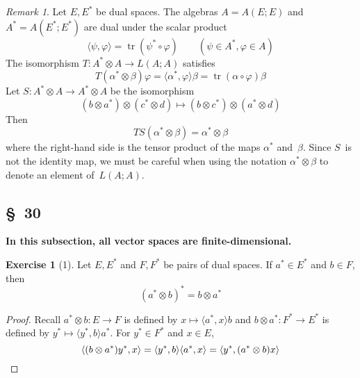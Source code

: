 \documentclass[letterpaper,12pt]{article}
\DeclareMathOperator{\tr}{tr}
\newcommand{\after}{\circ}
\newcommand{\tprod}{\otimes}
\newcommand{\sprod}[2]{\langle#1,#2\rangle}
\theoremstyle{definition}
\newtheorem*{exer}{Exercise}
\theoremstyle{remark}
\newtheorem*{rmk}{Remark}
\begin{document}
\begin{rmk}
Let \(E,E^*\) be dual spaces. The algebras \(A=A(E;E)\) and \(A^*=A(E^*;E^*)\) are dual under the scalar product
\[\sprod{\psi}{\varphi}=\tr(\psi^*\after\varphi)\qquad(\psi\in A^*,\varphi\in A)\]
The isomorphism \(T:A^*\tprod A\to L(A;A)\) satisfies
\[T(\alpha^*\tprod\beta)\varphi=\sprod{\alpha^*}{\varphi}\beta=\tr(\alpha\after\varphi)\beta\]
Let \(S:A^*\tprod A\to A^*\tprod A\) be the isomorphism
\[(b\tprod a^*)\tprod(c^*\tprod d)\mapsto(b\tprod c^*)\tprod(a^*\tprod d)\]
Then
\[TS(\alpha^*\tprod\beta)=\alpha^*\tprod\beta\]
where the right-hand side is the tensor product of the maps \(\alpha^*\) and~\(\beta\). Since \(S\)~is not the identity map, we must be careful when using the notation \(\alpha^*\tprod\beta\) to denote an element of~\(L(A;A)\).
\end{rmk}

\subsection*{\S~30}
\textbf{In this subsection, all vector spaces are finite-dimensional.}

\begin{exer}[1]
Let \(E,E^*\) and \(F,F^*\) be pairs of dual spaces. If \(a^*\in E^*\) and \(b\in F\), then
\[(a^*\tprod b)^*=b\tprod a^*\]
\end{exer}
\begin{proof}
Recall \(a^*\tprod b:E\to F\) is defined by \(x\mapsto\sprod{a^*}{x}b\) and \(b\tprod a^*:F^*\to E^*\) is defined by \(y^*\mapsto\sprod{y^*}{b}a^*\). For \(y^*\in F^*\) and \(x\in E\),
\[\sprod{(b\tprod a^*)y^*}{x}=\sprod{y^*}{b}\sprod{a^*}{x}=\sprod{y^*}{(a^*\tprod b)x}\qedhere\]
\end{proof}
\end{document}
